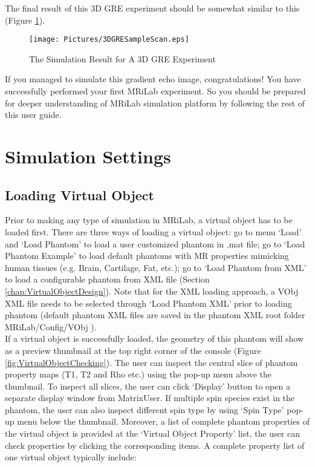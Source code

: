 \documentclass{book}%
\begin{document}
The final result of this 3D GRE experiment should be somewhat similar to this (Figure \ref{fig:3DGRESampleScan}).


\begin{figure}[htbp]
	\centering
		\texttt{[image: Pictures/3DGRESampleScan.eps]}
	\caption{The Simulation Result for A 3D GRE Experiment}
	\label{fig:3DGRESampleScan}
\end{figure}

If you managed to simulate this gradient echo image, congratulations! You have successfully performed your first MRiLab experiment. So you should be prepared for deeper understanding of MRiLab simulation platform by following the rest of this user guide.


\chapter{Simulation Settings}

\section{Loading Virtual Object} \label{chap:LoadingVirtualObject}

Prior to making any type of simulation in MRiLab, a virtual object has to be loaded first. There are three ways of loading a virtual object: go to menu `Load' and `Load Phantom' to load a user customized phantom in .mat file; go to `Load Phantom Example' to load default phantoms with MR properties mimicking human tissues (e.g. Brain, Cartilage, Fat, etc.); go to `Load Phantom from XML' to load a configurable phantom from XML file (Section \ref{chap:VirtualObjectDesign}). Note that for the XML loading approach, a VObj XML file needs to be selected through `Load Phantom XML' prior to loading phantom (default phantom XML files are saved in the phantom XML root folder MRiLab/Config/VObj ). \\

If a virtual object is successfully loaded, the geometry of this phantom will show as a preview thumbnail at the top right corner of the console (Figure \ref{fig:VirtualObjectChecking}). The user can inspect the central slice of phantom property maps (T1, T2 and Rho etc.) using the pop-up menu above the thumbnail. To inspect all slices, the user can click `Display' button to open a separate display window from MatrixUser. If multiple spin species exist in the phantom, the user can also inspect different spin type by using `Spin Type' pop-up menu below the thumbnail. Moreover, a list of complete phantom properties of the virtual object is provided at the `Virtual Object Property' list, the user can check properties by clicking the corresponding items. A complete property list of one virtual object typically include:
\end{document}
